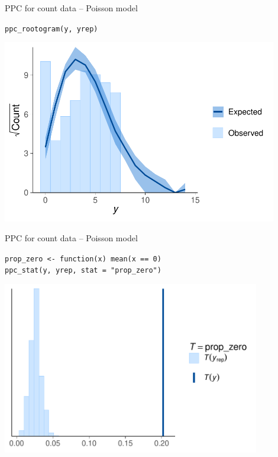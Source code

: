 \documentclass[t]{beamer}
\begin{document}
\begin{frame}{PPC for count data -- Poisson model}
  
  \vspace{-1\baselineskip}
  \texttt{ppc\_rootogram(y, yrep)}

    \includegraphics[height=8cm]{poisson_ppc_rootogram.pdf}

\end{frame}

\begin{frame}{PPC for count data -- Poisson model}
  
  \vspace{-1\baselineskip}
  \texttt{prop\_zero <- function(x) mean(x == 0)}\\
  \texttt{ppc\_stat(y, yrep, stat = "prop\_zero")}

    \includegraphics[height=7.5cm]{poisson_ppc_stat_propzero.pdf}

\end{frame}
\end{document}
